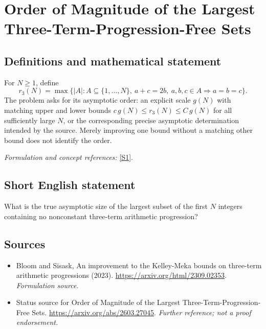 \documentclass[11pt]{article}
\begin{document}
\section*{\texorpdfstring{Order of Magnitude of the Largest Three-Term-Progression-Free Sets}{Order of Magnitude of the Largest Three-Term-Progression-Free Sets}}\label{30006754}
\subsection{Definitions and mathematical statement}
For $N\ge1$, define
\[
 r_3(N)=\max\{|A|:A\subseteq\{1,\ldots,N\},\
 a+c=2b,\ a,b,c\in A\Rightarrow a=b=c\}.
\]
The problem asks for its asymptotic order: an explicit scale $g(N)$ with matching upper and lower bounds $c\,g(N)\le r_3(N)\le C\,g(N)$ for all sufficiently large $N$, or the corresponding precise asymptotic determination intended by the source. Merely improving one bound without a matching other bound does not identify the order.
\par\smallskip\textit{Formulation and concept references:} \href{https://arxiv.org/html/2309.02353}{[S1]}.

\subsection{Short English statement}
What is the true asymptotic size of the largest subset of the first $N$ integers containing no nonconstant three-term arithmetic progression?
\subsection{Sources}
\begin{itemize}
\item[S1]Bloom and Sisask, An improvement to the Kelley-Meka bounds on three-term arithmetic progressions (2023).
\url{https://arxiv.org/html/2309.02353}.
\textit{Formulation source.}
\item[S2]Status source for Order of Magnitude of the Largest Three-Term-Progression-Free Sets.
\url{https://arxiv.org/abs/2603.27045}.
\textit{Further reference; not a proof endorsement.}
\end{itemize}
\end{document}
